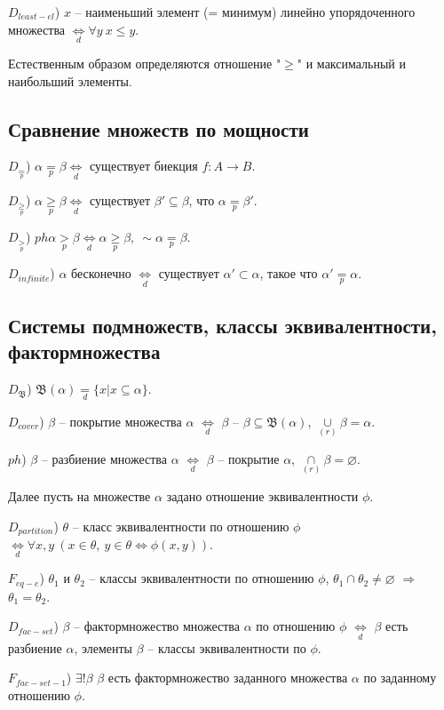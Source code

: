 \documentclass[a4paper]{article}
\newcommand{\Def}[0]{\underset{d}{\Leftrightarrow}}
\newcommand{\defeq}[0]{\underset{d}{=}}
\newcommand{\cupr}[0]{\underset{(r)}{\cup}} %
\newcommand{\capr}[0]{\underset{(r)}{\cap}} %
\newcommand{\eqp}[0]{\underset{p}{=}} %
\newcommand{\geqp}[0]{\underset{p}{\geq}} %
\newcommand{\gtp}[0]{\underset{p}{>}} %
\begin{document}
$D_{least-el}$) $x$ -- наименьший элемент (= минимум) линейно упорядоченного множества $\Def \forall y~x \leq y$.

Естественным образом определяются отношение "$\geq$" и максимальный и наибольший элементы.

\subsection{Сравнение множеств по мощности}

$D_{\eqp}$) $\alpha \eqp \beta \Def$ существует биекция $f: A \rightarrow B$.

$D_{\geqp}$) $\alpha \geqp \beta \Def$ существует $\beta' \subseteq \beta$, что $\alpha \eqp \beta'$.

$D_{\gtp}$) $ph\alpha \gtp \beta \Def \alpha \geqp \beta,~\sim \alpha \eqp \beta$.

$D_{infinite}$) $\alpha$ бесконечно $\Def$ существует $\alpha' \subset \alpha$, такое что $\alpha' \eqp \alpha$.

\subsection{Системы подмножеств, классы эквивалентности, фактормножества}

$D_{\mathfrak{B}}$) $\mathfrak{B}(\alpha) \defeq \{ x | x \subseteq \alpha \}$.

$D_{cover}$) $\beta$ -- покрытие множества $\alpha$ $\Def$ $\beta$ -- $\beta \subseteq \mathfrak{B}(\alpha)$, $\cupr \beta = \alpha$.

$ph$) $\beta$ -- разбиение множества $\alpha$ $\Def$ $\beta$ -- покрытие $\alpha$, $\capr \beta = \varnothing$.

Далее пусть на множестве $\alpha$ задано отношение эквивалентности $\phi$.

$D_{partition}$) $\theta$ -- класс эквивалентности по отношению $\phi$ $\Def \forall x, y~(x \in \theta,~y \in \theta \Leftrightarrow \phi(x, y))$.

$F_{eq-e}$) $\theta_1$ и $\theta_2$ -- классы эквивалентности по отношению $\phi$, $\theta_1 \cap \theta_2 \neq \varnothing$ $\Rightarrow$ $\theta_1 = \theta_2$.

$D_{fac-set}$) $\beta$ -- фактормножество множества $\alpha$ по отношению $\phi$ $\Def$ $\beta$ есть разбиение $\alpha$, элементы $\beta$ -- классы эквивалентности по $\phi$.

$F_{fac-set-1}$) $\exists! \beta$ $\beta$ есть фактормножество заданного множества $\alpha$ по заданному отношению $\phi$.
\end{document}
